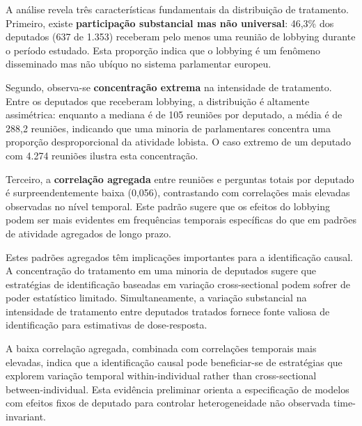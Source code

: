 A análise revela três características fundamentais da distribuição de tratamento. Primeiro, existe \textbf{participação substancial mas não universal}: 46,3\% dos deputados (637 de 1.353) receberam pelo menos uma reunião de lobbying durante o período estudado. Esta proporção indica que o lobbying é um fenômeno disseminado mas não ubíquo no sistema parlamentar europeu.

Segundo, observa-se \textbf{concentração extrema} na intensidade de tratamento. Entre os deputados que receberam lobbying, a distribuição é altamente assimétrica: enquanto a mediana é de 105 reuniões por deputado, a média é de 288,2 reuniões, indicando que uma minoria de parlamentares concentra uma proporção desproporcional da atividade lobista. O caso extremo de um deputado com 4.274 reuniões ilustra esta concentração.

Terceiro, a \textbf{correlação agregada} entre reuniões e perguntas totais por deputado é surpreendentemente baixa (0,056), contrastando com correlações mais elevadas observadas no nível temporal. Este padrão sugere que os efeitos do lobbying podem ser mais evidentes em frequências temporais específicas do que em padrões de atividade agregados de longo prazo.


Estes padrões agregados têm implicações importantes para a identificação causal. A concentração do tratamento em uma minoria de deputados sugere que estratégias de identificação baseadas em variação cross-sectional podem sofrer de poder estatístico limitado. Simultaneamente, a variação substancial na intensidade de tratamento entre deputados tratados fornece fonte valiosa de identificação para estimativas de dose-resposta.

A baixa correlação agregada, combinada com correlações temporais mais elevadas, indica que a identificação causal pode beneficiar-se de estratégias que explorem variação temporal within-individual rather than cross-sectional between-individual. Esta evidência preliminar orienta a especificação de modelos com efeitos fixos de deputado para controlar heterogeneidade não observada time-invariant.


